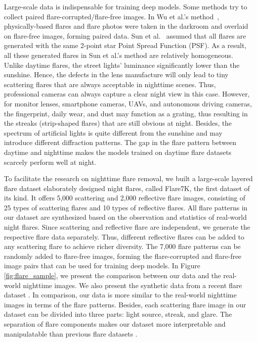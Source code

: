 \documentclass{article}
\newcommand{\yuekun}[1]{{\color{black}{#1}}}
\begin{document}
Large-scale data is indispensable for training deep models.
Some methods try to collect paired flare-corrupted/flare-free images. 
In Wu et al.'s method~\cite{how_to}, physically-based flares and flare photos were taken in the darkroom and overlaid on flare-free images, forming paired data.
Sun et al.~\cite{rank_1} assumed that all flares are generated with the same 2-point star Point Spread Function (PSF). 
As a result, all these generated flares in Sun et al.'s method are relatively homogeneous. 
Unlike daytime flares, the street lights' luminance \yuekun{is} significantly lower than the sunshine. 
Hence, the defects in the lens manufacture will only lead to tiny scattering flares that are always acceptable in nighttime scenes. 
Thus, professional cameras can always capture a clear night view in this case. 
However, for monitor lenses, smartphone cameras, UAVs, and autonomous driving cameras, the fingerprint, daily wear, and dust may function as a grating, thus resulting in the streaks (strip-shaped flares) that are still obvious at night. Besides, the spectrum of artificial lights is quite different from the sunshine and may introduce different diffraction patterns.
The gap in the flare pattern between daytime and nighttime makes the models trained on daytime flare datasets scarcely perform well at night. 

To facilitate the research on nighttime flare removal, we built a large-scale layered flare dataset \yuekun{with} elaborately designed night flares, called Flare7K, the first dataset of its kind.
It offers 5,000 scattering and 2,000 reflective flare images, consisting of 25 types of scattering flares and 10 types of reflective flares.
All flare patterns in our dataset are synthesized based on the observation and statistics of real-world night flares. 
Since scattering and reflective flare are independent, we generate the respective flare data separately. 
Thus, different reflective flares can be added to any scattering flare to achieve richer diversity. 
The 7,000 flare patterns can be randomly added to flare-free images, forming the flare-corrupted and flare-free image pairs that can be used for training deep models. 
In Figure \ref{fig:flare_sample}, we present the comparison between our data and the real-world nighttime images. We also present the synthetic data from a recent flare dataset \cite{how_to}. In comparison, our data is more similar to the real-world nighttime images in terms of the flare patterns.
Besides, each scattering flare image in our dataset can be divided into three parts: light source, streak, and glare. 
The separation of flare components makes our dataset more interpretable and manipulatable than previous flare datasets \cite{how_to}. 
\end{document}
